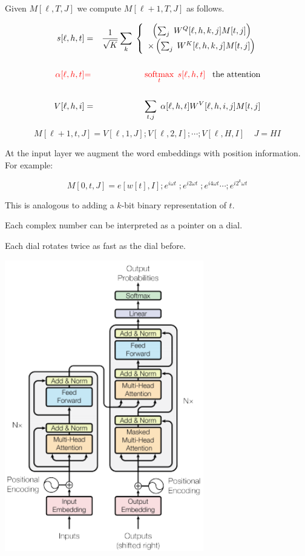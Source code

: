 {

Given {\color{red} $M[\ell,T,J]$} we compute {\color{red} $M[\ell+1,T,J]$} as follows.
      
\begin{eqnarray*}
s[\ell,h,t] & = &\frac{1}{\sqrt{K}} \sum_k\;\left\{\begin{array}{ll}\;\;\left(\sum_j\;W^Q[\ell,h,k,j]M[t,j]\right) \\
\times \left(\sum_j\;W^K[\ell,h,k,j]M[t,j]\right) \end{array}\right.\\
\\
{\color{red} \alpha[\ell,h,t]} & {\color{red} =} & {\color{red} \operatorname*{softmax}_t \;s[\ell,h,t]}\;\;\;\mbox{the attention} \\
\\
V[\ell,h,i] & = & \sum_{t,j}\;\alpha[\ell,h,t]W^V[\ell,h,i,j]M[t,j]
\end{eqnarray*}

\bigskip
{\color{red} $$M[\ell+1,t,J] = V[\ell,1,J];V[\ell,2,I];\cdots;V[\ell,H,I] \;\;\;\; J = HI$$}


At the input layer we augment the word embeddings with position information. For example:

\vfill
{\color{red} $$M[0,t,J] = e[w[t],I];e^{i\omega t}\;;e^{i2\omega t}\;;e^{i4\omega t}\cdots;e^{i2^k\omega t}$$}

\vfill
This is analogous to adding a $k$-bit binary representation of $t$.

\vfill
Each complex number can be interpreted as a pointer on a dial.

\vfill
Each dial rotates twice as fast as the dial before.


\centerline{\includegraphics[height=5in]{../images/Transformerb}}




}
